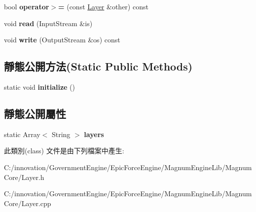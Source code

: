 \begin{DoxyCompactItemize}
\item 
bool {\bfseries operator$>$=} (const \hyperlink{classi_dream_sky_1_1_layer}{Layer} \&other) const \hypertarget{classi_dream_sky_1_1_layer_a0bd629665d6e657d52702fe2c45e73d1}{}\label{classi_dream_sky_1_1_layer_a0bd629665d6e657d52702fe2c45e73d1}

\item 
void {\bfseries read} (Input\+Stream \&is)\hypertarget{classi_dream_sky_1_1_layer_a81ed371d4688ac553d0569779e3f2601}{}\label{classi_dream_sky_1_1_layer_a81ed371d4688ac553d0569779e3f2601}

\item 
void {\bfseries write} (Output\+Stream \&os) const \hypertarget{classi_dream_sky_1_1_layer_aaabff3625bc9ead0ac209bb31ccff3fd}{}\label{classi_dream_sky_1_1_layer_aaabff3625bc9ead0ac209bb31ccff3fd}

\end{DoxyCompactItemize}
\subsection*{靜態公開方法(Static Public Methods)}
\begin{DoxyCompactItemize}
\item 
static void {\bfseries initialize} ()\hypertarget{classi_dream_sky_1_1_layer_a73e3b04ba32db857c1bf935b3153db44}{}\label{classi_dream_sky_1_1_layer_a73e3b04ba32db857c1bf935b3153db44}

\end{DoxyCompactItemize}
\subsection*{靜態公開屬性}
\begin{DoxyCompactItemize}
\item 
static Array$<$ String $>$ {\bfseries layers}\hypertarget{classi_dream_sky_1_1_layer_a05d82a002876614356efa0d93f68d65c}{}\label{classi_dream_sky_1_1_layer_a05d82a002876614356efa0d93f68d65c}

\end{DoxyCompactItemize}


此類別(class) 文件是由下列檔案中產生\+:\begin{DoxyCompactItemize}
\item 
C\+:/innovation/\+Government\+Engine/\+Epic\+Force\+Engine/\+Magnum\+Engine\+Lib/\+Magnum\+Core/Layer.\+h\item 
C\+:/innovation/\+Government\+Engine/\+Epic\+Force\+Engine/\+Magnum\+Engine\+Lib/\+Magnum\+Core/Layer.\+cpp\end{DoxyCompactItemize}
